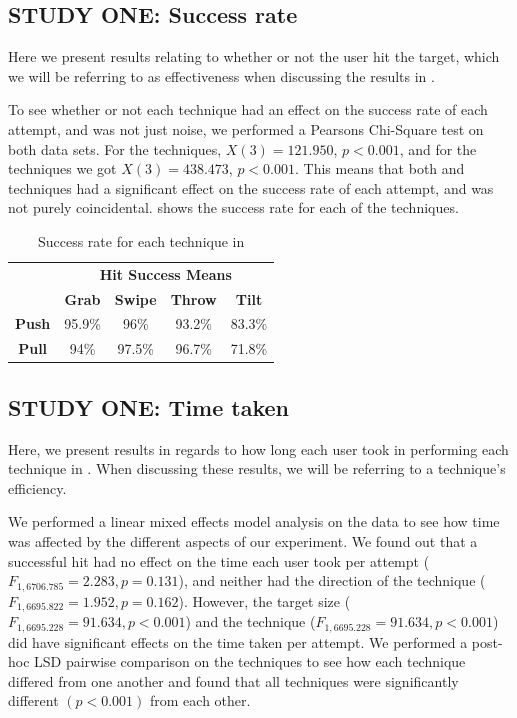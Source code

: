\subsection{STUDY ONE: Success rate}
Here we present results relating to whether or not the user hit the target, which we will be referring to as effectiveness when discussing the results in \studyone. 

To see whether or not each technique had an effect on the success rate of each attempt, and was not just noise, we performed a Pearsons Chi-Square test on both data sets. 
For the \push techniques, $X(3)=121.950$, $p<0.001$, and for the \pull techniques we got $X(3)=438.473$, $p<0.001$. 
This means that both \push and \pull techniques had a significant effect on the success rate of each attempt, and was not purely coincidental. 
 shows the success rate for each of the techniques. 

\begin{table}[H]
	\centering
	\def\arraystretch{1.5}
		\begin{tabular}{c c c c c}
			& \multicolumn{4}{c}{\textbf{Hit Success Means}} \\
			\cline{2-5}
			& \textbf{Grab} & \textbf{Swipe} & \textbf{Throw} & \textbf{Tilt} \\ \hline
			\textbf{Push} & 95.9\% & 96\% & 93.2\% & 83.3\% \\ \hline
			\textbf{Pull} & 94\% & 97.5\% & 96.7\% & 71.8\% \\ \hline
		\end{tabular}
	\caption{Success rate for each technique in \studyone}
	\label{tab:successRate}
\end{table}

\subsection{STUDY ONE: Time taken}
Here, we present results in regards to how long each user took in performing each technique in \studyone. 
When discussing these results, we will be referring to a technique's efficiency.

We performed a linear mixed effects model analysis on the data to see how time was affected by the different aspects of our experiment. 
We found out that a successful hit had no effect on the time each user took per attempt ($F_{1,6706.785} = 2.283, p = 0.131$), and neither had the direction of the technique ($F_{1,6695.822} = 1.952, p = 0.162$). 
However, the target size ($F_{1,6695.228} = 91.634, p < 0.001$) and the technique  ($F_{1,6695.228} = 91.634, p < 0.001$) did have significant effects on the time taken per attempt. 
We performed a post-hoc LSD pairwise comparison on the techniques to see how each technique differed from one another and found that all techniques were significantly different $(p<0.001)$ from each other. 


